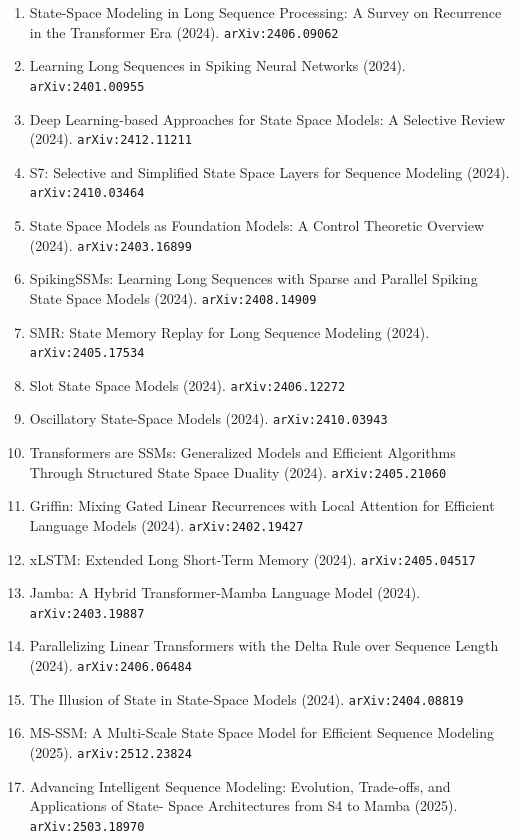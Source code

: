 \documentclass[11pt]{article}
\begin{document}
\begin{enumerate}
  Models (2024). \texttt{arXiv:2410.03158}
  \item State-Space Modeling in Long Sequence Processing: A Survey on Recurrence in the Transformer Era (2024). \texttt{arXiv:2406.09062}
  \item Learning Long Sequences in Spiking Neural Networks (2024). \texttt{arXiv:2401.00955}
  \item Deep Learning-based Approaches for State Space Models: A Selective
  Review (2024). \texttt{arXiv:2412.11211}
  \item S7: Selective and Simplified State Space Layers for Sequence Modeling (2024). \texttt{arXiv:2410.03464}
  \item State Space Models as Foundation Models: A Control Theoretic Overview (2024). \texttt{arXiv:2403.16899}
  \item SpikingSSMs: Learning Long Sequences with Sparse and Parallel Spiking
  State Space Models (2024). \texttt{arXiv:2408.14909}
  \item SMR: State Memory Replay for Long Sequence Modeling (2024). \texttt{arXiv:2405.17534}
  \item Slot State Space Models (2024). \texttt{arXiv:2406.12272}
  \item Oscillatory State-Space Models (2024). \texttt{arXiv:2410.03943}
  \item Transformers are SSMs: Generalized Models and Efficient Algorithms
  Through Structured State Space Duality (2024). \texttt{arXiv:2405.21060}
  \item Griffin: Mixing Gated Linear Recurrences with Local Attention for
  Efficient Language Models (2024). \texttt{arXiv:2402.19427}
  \item xLSTM: Extended Long Short-Term Memory (2024). \texttt{arXiv:2405.04517}
  \item Jamba: A Hybrid Transformer-Mamba Language Model (2024). \texttt{arXiv:2403.19887}
  \item Parallelizing Linear Transformers with the Delta Rule over Sequence
  Length (2024). \texttt{arXiv:2406.06484}
  \item The Illusion of State in State-Space Models (2024). \texttt{arXiv:2404.08819}
  \item MS-SSM: A Multi-Scale State Space Model for Efficient Sequence Modeling (2025). \texttt{arXiv:2512.23824}
  \item Advancing Intelligent Sequence Modeling: Evolution, Trade-offs, and Applications of State- Space Architectures from S4 to Mamba (2025). \texttt{arXiv:2503.18970}

\end{enumerate}
\end{document}
